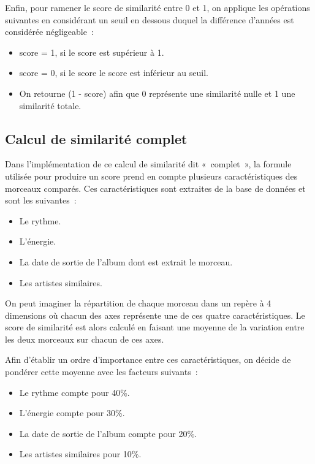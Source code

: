 Enfin, pour ramener le score de similarité entre 0 et 1, on applique les
opérations suivantes en considérant un seuil en dessous duquel la différence
d'années est considérée négligeable~:

\begin{itemize}
\item score = 1, si le score est supérieur à 1. 
\item score = 0, si le score le score est inférieur au seuil.
\item On retourne (1 - score) afin que 0 représente une similarité nulle et 1
une similarité totale.
\end{itemize}

\subsection{Calcul de similarité complet}
\label{impl:similarite:complet}

Dans l'implémentation de ce calcul de similarité dit «~complet~», la formule
utilisée pour produire un score prend en compte plusieurs caractéristiques des
morceaux comparés. Ces caractéristiques sont extraites de la base de données
et sont les suivantes~:

\begin{itemize}
\item Le rythme.
\item L'énergie.
\item La date de sortie de l'album dont est extrait le morceau.
\item Les artistes similaires.
\end{itemize}

On peut imaginer la répartition de chaque morceau dans un repère à 4
dimensions où chacun des axes représente une de ces quatre caractéristiques.
Le score de similarité est alors calculé en faisant une moyenne de la
variation entre les deux morceaux sur chacun de ces axes.

Afin d'établir un ordre d'importance entre ces caractéristiques, on décide de
pondérer cette moyenne avec les facteurs suivants~:

\begin{itemize}
\item Le rythme compte pour 40\%.
\item L'énergie compte pour 30\%.
\item La date de sortie de l'album compte pour 20\%.
\item Les artistes similaires pour 10\%.
\end{itemize}

